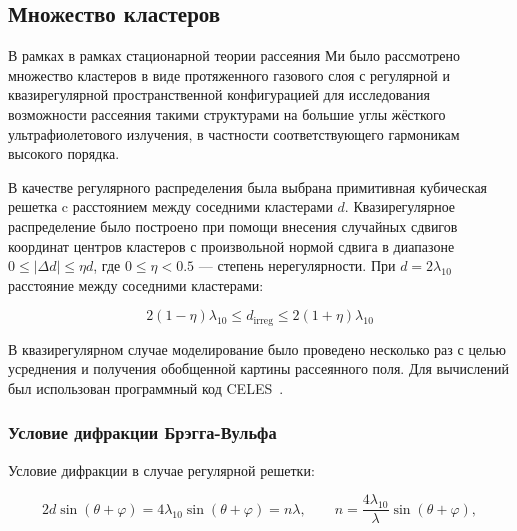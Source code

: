 \subsection{Множество кластеров}

В рамках в рамках стационарной теории рассеяния Ми было рассмотрено множество кластеров в виде протяженного газового слоя с регулярной и квазирегулярной пространственной конфигурацией для исследования возможности рассеяния такими структурами на большие углы жёсткого ультрафиолетового излучения, в частности соответствующего гармоникам высокого порядка.

В качестве регулярного распределения была выбрана примитивная кубическая решетка c расстоянием между соседними кластерами $d$. Квазирегулярное распределение было построено при помощи внесения случайных сдвигов координат центров кластеров с произвольной нормой сдвига в диапазоне $0 \leq |\Delta d| \leq \eta d$, где $0 \leq \eta < 0.5$ --- степень нерегулярности. При $d = 2\lambda_{10}$ расстояние между соседними кластерами:

    \begin{equation}
        2\left(1 - \eta\right)\lambda_{10} \le d_{\textrm{irreg}} \le 2\left(1 + \eta\right)\lambda_{10}
    \end{equation}

В квазирегулярном случае моделирование было проведено несколько раз с целью усреднения и получения обобщенной картины рассеянного поля. Для вычислений был использован программный код CELES~\cite{celes}.

\subsubsection{Условие дифракции Брэгга-Вульфа}


Условие дифракции в случае регулярной решетки:

    \begin{equation}
        2 d \sin(\theta+\varphi) = 4 \lambda_{10} \sin(\theta+\varphi) = n \lambda, \qquad n = \frac{4 \lambda_{10}}{\lambda} \sin(\theta+\varphi),
        \label{bragg_wolf_order}
    \end{equation}

